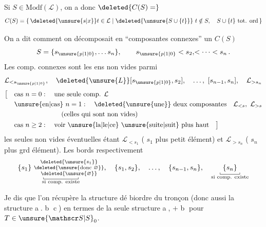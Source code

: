 Si $S\in\mathrm{Modf}(\mathcal L)$, on a donc $\deleted{C(S)=}$
\[
C(S)=\{\,\deleted{\unsure{s|x}}t\in\mathcal L\mid\deleted{\unsure{S\cup\{t\}}}\ t\notin S,\quad S\cup\{t\}\ \text{tot. ord}\,\}
\]

On a dit comment on décomposait en ``composantes connexes'' un $C(S)$ 
\[
 S=\{s_{\unsure{p|1|0}},\ldots s_n\},\qquad s_{\unsure{p|1|0}}<s_2,\!<\cdots<s_n\,.
\]
Les comp. connexes sont les ens non vides parmi
\[
\mathcal L_{<s_{\unsure{p|1|0}}},\quad \deleted{\unsure{L}}[s_{\unsure{p|1|0}},s_2],\quad\ldots,\ [s_{n-1},s_n],\quad \mathcal L_{>s_n}
\]
\[
\begin{aligned}
\bigl[\quad&\text{cas }n=0:\quad\text{une seule comp. }\mathcal L\\
&\text{\unsure{en|cas} }n=1:\quad\deleted{\text{\unsure{une}}}\ \text{deux composantes}\quad \mathcal L_{<s},\ \mathcal L_{>s}\\
&\hspace{7em}\text{(celles qui sont non vides)}\\
&\text{cas }n\geq2:\quad\text{voir \unsure{la|le|ce} \unsure{suite|suit} plus haut}\quad\bigr]
\end{aligned}
\]
les seules non vides éventuelles étant $\mathcal L_{<s_1}$ ( $s_1$ plus petit élément) et $\mathcal L_{>s_n}$ ( $s_n$ plus grd élément). Les bords  respectivement
\[
\underset{\substack{\rule{.4pt}{.6ex}\rule{4.8em}{.4pt}\rule{.4pt}{.6ex}\\\text{si comp. existe}}}{\{s_1\}\ \substack{\deleted{\unsure{s_1}}\\\deleted{\unsure{\text{donc }\varnothing}}\\\deleted{\unsure{\varnothing}}}},
\quad\{s_1,s_2\},\quad\ldots,\quad\{s_{n-1},s_n\},\quad
\underset{\substack{\rule{.4pt}{.6ex}\rule{2.7em}{.4pt}\rule{.4pt}{.6ex}\\\text{si comp. existe}}}{\{s_n\}}
\]

Je dis que l'on récupère la structure dé  biordre du tronçon (donc aussi la structure \textcircled{a}. \textcircled{b} \textcircled{c}) en termes de la seule structure \textcircled{a}, $+$ \textcircled{b} pour $T\in\unsure{\mathscr S|S}_0$.

